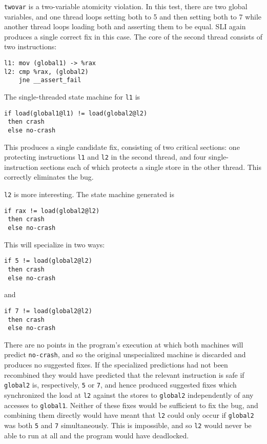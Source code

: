 \documentclass[10pt,twocolumn,preprint,natbib,authoryear]{sigplanconf}
\begin{document}
\verb|twovar| is a two-variable atomicity violation.  In this test,
there are two global variables, and one thread loops setting both to 5
and then setting both to 7 while another thread loops loading both and
asserting them to be equal.  SLI again produces a single correct fix
in this case.  The core of the second thread consists of two
instructions:

\begin{verbatim}
l1: mov (global1) -> %rax
l2: cmp %rax, (global2)
    jne __assert_fail
\end{verbatim}

The single-threaded state machine for \verb|l1| is

\begin{verbatim}
if load(global1@l1) != load(global2@l2)
 then crash
 else no-crash
\end{verbatim}

\noindent
This produces a single candidate fix, consisting of two critical
sections: one protecting instructions \verb|l1| and \verb|l2| in the
second thread, and four single-instruction sections each of which
protects a single store in the other thread.  This correctly
eliminates the bug.

\verb|l2| is more interesting.  The state machine generated is

\begin{verbatim}
if rax != load(global2@l2)
 then crash
 else no-crash
\end{verbatim}

\noindent
This will specialize in two ways:

\begin{verbatim}
if 5 != load(global2@l2)
 then crash
 else no-crash
\end{verbatim}

\noindent{}and

\begin{verbatim}
if 7 != load(global2@l2)
 then crash
 else no-crash
\end{verbatim}

\noindent
There are no points in the program's execution at which both machines
will predict \verb|no-crash|, and so the original unspecialized
machine is discarded and produces no suggested fixes.  If the
specialized predictions had not been recombined they would have
predicted that the relevant instruction is safe if \verb|global2| is,
respectively, \verb|5| or \verb|7|, and hence produced suggested fixes
which synchronized the load at \verb|l2| against the stores to
\verb|global2| independently of any accesses to \verb|global1|.
Neither of these fixes would be sufficient to fix the bug, and
combining them directly would have meant that \verb|l2| could only
occur if \verb|global2| was both \verb|5| and \verb|7| simultaneously.
This is impossible, and so \verb|l2| would never be able to run at all
and the program would have deadlocked.
\end{document}
